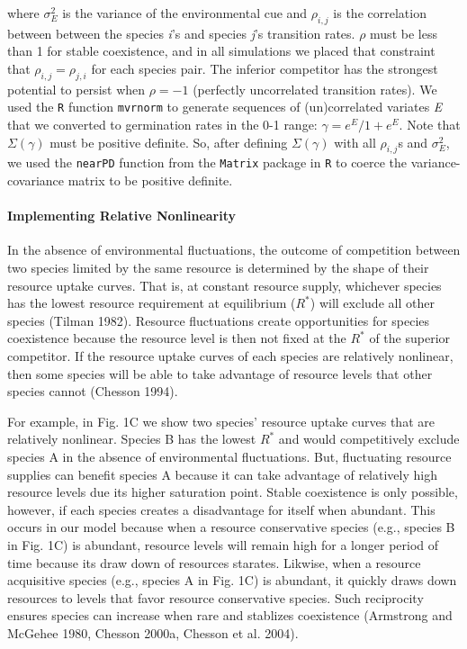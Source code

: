 \documentclass[12pt,]{article}
\begin{document}
\noindent where \(\sigma^2_{E}\) is the variance of the environmental
cue and \(\rho_{i,j}\) is the correlation between between the species
\emph{i}'s and species \emph{j}'s transition rates. \(\rho\) must be
less than 1 for stable coexistence, and in all simulations we placed
that constraint that \(\rho_{i,j} = \rho_{j,i}\) for each species pair.
The inferior competitor has the strongest potential to persist when
\(\rho=-1\) (perfectly uncorrelated transition rates). We used the
\texttt{R} function \texttt{mvrnorm} to generate sequences of
(un)correlated variates \emph{E} that we converted to germination rates
in the 0-1 range: \(\gamma = e^E / 1 + e^E\). Note that
\(\Sigma(\gamma)\) must be positive definite. So, after defining
\(\Sigma(\gamma)\) with all \(\rho_{i,j}\)s and \(\sigma^2_{E}\), we
used the \texttt{nearPD} function from the \texttt{Matrix} package in
\texttt{R} to coerce the variance-covariance matrix to be positive
definite.

\paragraph{Implementing Relative
Nonlinearity}\label{implementing-relative-nonlinearity}

In the absence of environmental fluctuations, the outcome of competition
between two species limited by the same resource is determined by the
shape of their resource uptake curves. That is, at constant resource
supply, whichever species has the lowest resource requirement at
equilibrium (\(R^*\)) will exclude all other species (Tilman 1982).
Resource fluctuations create opportunities for species coexistence
because the resource level is then not fixed at the \(R^*\) of the
superior competitor. If the resource uptake curves of each species are
relatively nonlinear, then some species will be able to take advantage
of resource levels that other species cannot (Chesson 1994).

For example, in Fig. 1C we show two species' resource uptake curves that
are relatively nonlinear. Species B has the lowest \(R^*\) and would
competitively exclude species A in the absence of environmental
fluctuations. But, fluctuating resource supplies can benefit species A
because it can take advantage of relatively high resource levels due its
higher saturation point. Stable coexistence is only possible, however,
if each species creates a disadvantage for itself when abundant. This
occurs in our model because when a resource conservative species (e.g.,
species B in Fig. 1C) is abundant, resource levels will remain high for
a longer period of time because its draw down of resources starates.
Likwise, when a resource acquisitive species (e.g., species A in Fig.
1C) is abundant, it quickly draws down resources to levels that favor
resource conservative species. Such reciprocity ensures species can
increase when rare and stablizes coexistence (Armstrong and McGehee
1980, Chesson 2000a, Chesson et al. 2004).
\end{document}
